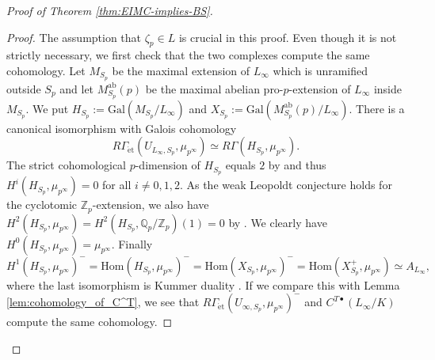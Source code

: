 \documentclass[12pt]{amsart}
\theoremstyle{plain}
\theoremstyle{remark}
\theoremstyle{definition}
\numberwithin{equation}{section}
\begin{document}
{\begin{proof}[Proof of Theorem \ref{thm:EIMC-implies-BS}]
\begin{proof}
The assumption that $\zeta_{p} \in L$ is crucial in this proof.
Even though it is not strictly necessary, we first check that the two complexes compute the same cohomology.
Let $M_{S_{p}}$ be the maximal extension of $L_{\infty}$ which is unramified outside $S_{p}$ and let $M_{S_{p}}^{\mathrm{ab}}(p)$ be the maximal abelian
pro-$p$-extension of $L_{\infty}$ inside $M_{S_{p}}$.
We put $H_{S_{p}} := {\mathrm{Gal}}(M_{S_{p}} / L_{\infty})$ and $X_{S_{p}} := {\mathrm{Gal}}(M_{S_{p}}^{\mathrm{ab}}(p) / L_{\infty})$.
There is a canonical isomorphism with Galois cohomology
\begin{equation} \label{eqn:etale-to-Galois}
R\Gamma_{\mathrm{\acute{e}t}}(U_{L_{\infty}, S_{p}}, \mu_{p^{\infty}}) \simeq R\Gamma(H_{S_{p}}, \mu_{p^{\infty}}).
\end{equation}
The strict cohomological $p$-dimension of $H_{S_{p}}$ equals $2$ by \cite[Corollary 10.3.26]{MR2392026} and thus
$H^{i}(H_{S_{p}}, \mu_{p^{\infty}}) = 0$ for all $i \not= 0,1,2$. As the weak Leopoldt conjecture holds for the cyclotomic
${\mathbb{Z}}_{p}$-extension, we also have $H^{2}(H_{S_{p}}, \mu_{p^{\infty}}) = H^{2}(H_{S_{p}}, {\mathbb{Q}}_{p} / {\mathbb{Z}}_{p})(1) = 0$
by \cite[Theorem 11.3.2]{MR2392026}. We clearly have $H^{0}(H_{S_{p}}, \mu_{p^{\infty}}) = \mu_{p^{\infty}}$. Finally
\[
H^{1}(H_{S_{p}}, \mu_{p^{\infty}})^{-} =  {\mathrm{Hom}}(H_{S_{p}}, \mu_{p^{\infty}})^{-} =  {\mathrm{Hom}}(X_{S_{p}}, \mu_{p^{\infty}})^{-}
= {\mathrm{Hom}}(X_{S_{p}}^{+}, \mu_{p^{\infty}}) \simeq  A_{L_{\infty}},
\]
where the last isomorphism is Kummer duality \cite[Theorem 11.4.3]{MR2392026}. 
If we compare this with Lemma \ref{lem:cohomology_of_C^T},
we see that $R\Gamma_{\mathrm{\acute{e}t}}(U_{\infty, S_{p}}, \mu_{p^{\infty}})^{-}$ and $C^{T \bullet}(L_{\infty}/K)$
compute the same cohomology.


\end{proof}
\end{proof}}
\end{document}
